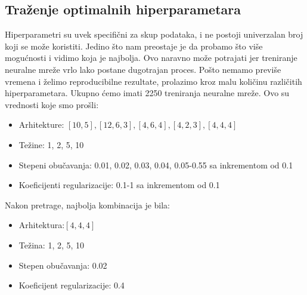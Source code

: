 \documentclass{article}
\newenvironment{solution}[2][]
    { \begin{mdframed}[backgroundcolor=gray!0] \textbf{#1 #2}}
    {  \end{mdframed}}
\begin{document}
    \begin{solution}{}
    \subsection*{Traženje optimalnih hiperparametara}
    Hiperparametri su uvek specifični za skup podataka, i ne postoji univerzalan broj koji se može koristiti. Jedino što nam preostaje je da probamo što više mogućnosti i vidimo koja je najbolja. Ovo naravno može potrajati jer treniranje neuralne mreže vrlo lako postane dugotrajan proces.
    Pošto nemamo previše vremena i želimo reproducibilne rezultate, prolazimo kroz malu količinu različitih hiperparametara. Ukupno ćemo imati 2250 treniranja neuralne mreže.
    Ovo su vrednosti koje smo prošli:
    \begin{itemize}
        \item Arhitekture: $[10, 5], [12, 6, 3], [4,6,4], [4,2,3], [4,4,4]$
        \item Težine: 1, 2, 5, 10
        \item Stepeni obučavanja: 0.01, 0.02, 0.03, 0.04, 0.05-0.55 sa inkrementom od 0.1
        \item Koeficijenti regularizacije: 0.1-1 sa inkrementom od 0.1
    \end{itemize}
    Nakon pretrage, najbolja kombinacija je bila:
    \begin{itemize}
        \item Arhitektura:$[4,4,4]$
        \item Težina: 1, 2, 5, 10\item Stepen obučavanja: 0.02
        \item Koeficijent regularizacije: 0.4
    \end{itemize}
    \end{solution}\newpage
\end{document}
